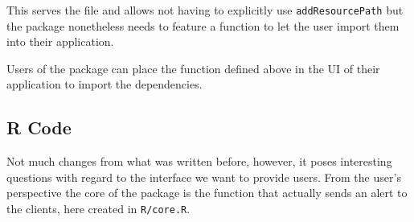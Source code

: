 \documentclass[
]{krantz}
\makeatletter
\newenvironment{Shaded}{\begin{snugshade}}{\end{snugshade}}
\newcommand{\CommentTok}[1]{\textcolor[rgb]{0.37,0.37,0.37}{\textit{#1}}}
\newcommand{\ControlFlowTok}[1]{\textcolor[rgb]{0.27,0.27,0.27}{\textbf{#1}}}
\newcommand{\DataTypeTok}[1]{\textcolor[rgb]{0.27,0.27,0.27}{#1}}
\newcommand{\KeywordTok}[1]{\textcolor[rgb]{0.27,0.27,0.27}{\textbf{#1}}}
\newcommand{\NormalTok}[1]{#1}
\newcommand{\OperatorTok}[1]{\textcolor[rgb]{0.43,0.43,0.43}{\textbf{#1}}}
\newcommand{\StringTok}[1]{\textcolor[rgb]{0.5,0.5,0.5}{#1}}
\newenvironment{kframe}{%
\medskip{}
\setlength{\fboxsep}{.8em}
 \def\at@end@of@kframe{}%
 \ifinner\ifhmode%
  \def\at@end@of@kframe{\end{minipage}}%
  \begin{minipage}{\columnwidth}%
 \fi\fi%
 \def\FrameCommand##1{\hskip\@totalleftmargin \hskip-\fboxsep
 \colorbox{shadecolor}{##1}\hskip-\fboxsep
     \hskip-\linewidth \hskip-\@totalleftmargin \hskip\columnwidth}%
 \MakeFramed {\advance\hsize-\width
   \@totalleftmargin\z@ \linewidth\hsize
   \@setminipage}}%
 {\par\unskip\endMakeFramed%
 \at@end@of@kframe}
\renewenvironment{Shaded}{\begin{kframe}}{\end{kframe}}
\makeatother
\begin{document}
This serves the file and allows not having to explicitly use \texttt{addResourcePath} but the package nonetheless needs to feature a function to let the user import them into their application.

\begin{Shaded}
\end{Shaded}

Users of the package can place the function defined above in the UI of their application to import the dependencies.

\hypertarget{r-code}{%
\subsection*{R Code}\label{r-code}}


Not much changes from what was written before, however, it poses interesting questions with regard to the interface we want to provide users. From the user's perspective the core of the package is the function that actually sends an alert to the clients, here created in \texttt{R/core.R}.

\begin{Shaded}
\end{Shaded}
\end{document}
